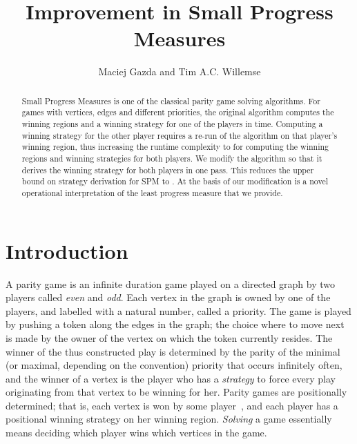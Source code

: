 \documentclass{eptcs}
\title{Improvement in Small Progress Measures}
\author{Maciej Gazda and Tim A.C. Willemse
\institute{Eindhoven University of Technology, The Netherlands}
}
\begin{document}
\maketitle 


\begin{abstract}
Small Progress Measures is one of the classical parity game solving
algorithms. For games with  vertices,  edges and  different
priorities, the original algorithm computes the winning regions and
a winning strategy for one of the players in  time.
Computing a winning strategy for the other player requires a re-run
of the algorithm on that player's winning region, thus increasing
the runtime complexity to  for computing the winning
regions and winning strategies for both players. We modify the
algorithm so that it derives the winning strategy for both players
in one pass. This reduces the upper bound on strategy derivation
for SPM to . At the basis of our modification is a
novel operational interpretation of the least progress measure that
we provide.  \end{abstract}

\section{Introduction}


A parity game \cite{EJ:91,McN:93,Zie:98} is an infinite duration
game played on a directed graph by two players called \emph{even}
and \emph{odd}. Each vertex in the graph is owned by one of the
players, and labelled with a natural number, called a priority.
The game is played by pushing a token along the edges in the graph;
the choice where to move next is made by the owner of the vertex
on which the token currently resides.  The winner of the thus
constructed play is determined by the parity of the minimal (or
maximal, depending on the convention) priority that occurs infinitely
often, and the winner of a vertex is the player who has a \emph{strategy}
to force every play originating from that vertex to be winning for
her.  Parity games are positionally determined; that is, each vertex is won by
some player~\cite{McN:93}, and  each player has a positional winning strategy
on her winning region. \emph{Solving} a game essentially means
deciding which player wins which vertices in the game.
\end{document}
